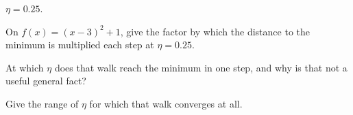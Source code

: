 \begin{testexercises}
  $\eta = \num{0.25}$.
\item On $f(x) = (x-3)^{2} + 1$, give the factor by which the distance to the
  minimum is multiplied each step at $\eta = \num{0.25}$.
\item At which $\eta$ does that walk reach the minimum in one step, and why is
  that not a useful general fact?
\item Give the range of $\eta$ for which that walk converges at all.
\end{testexercises}

